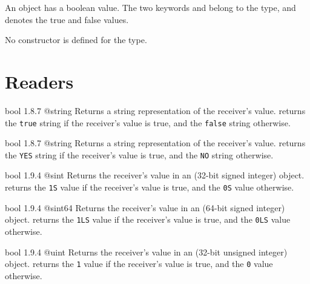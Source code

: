 

An  object has a boolean value. The two keywords  and  belong to the  type, and denotes the true and false values.

No constructor is defined for the  type.

\section{Readers}

{bool}
{1.8.7}
{@string}
{Returns a string representation of the receiver's value.}
{returns the \texttt{\textquotedbl true\textquotedbl} string if the receiver's value is true, and the \texttt{\textquotedbl false\textquotedbl} string otherwise.}







{bool}
{1.8.7}
{@string}
{Returns a string representation of the receiver's value.}
{returns the \texttt{\textquotedbl YES\textquotedbl} string if the receiver's value is true, and the \texttt{\textquotedbl NO\textquotedbl} string otherwise.}




{bool}
{1.9.4}
{@sint}
{Returns the receiver's value in an  (32-bit signed integer) object.}
{returns the \texttt{1S}  value if the receiver's value is true, and the \texttt{0S}  value otherwise.}




{bool}
{1.9.4}
{@sint64}
{Returns the receiver's value in an  (64-bit signed integer) object.}
{returns the \texttt{1LS}  value if the receiver's value is true, and the \texttt{0LS}  value otherwise.}




{bool}
{1.9.4}
{@uint}
{Returns the receiver's value in an  (32-bit unsigned integer) object.}
{returns the \texttt{1}  value if the receiver's value is true, and the \texttt{0}  value otherwise.}




